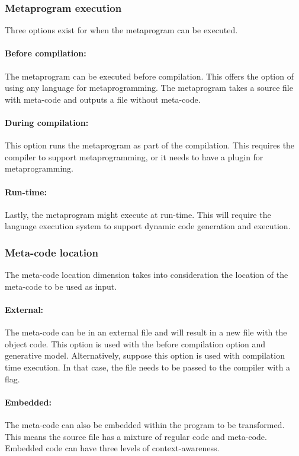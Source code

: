 \subsubsection{Metaprogram execution}
Three options exist for when the metaprogram can be executed.

\paragraph{Before compilation:}
The metaprogram can be executed before compilation.
This offers the option of using any language for metaprogramming.
The metaprogram takes a source file with meta-code and outputs a file without meta-code.

\paragraph{During compilation:}
This option runs the metaprogram as part of the compilation.
This requires the compiler to support metaprogramming, or it needs to have a plugin for metaprogramming.

\paragraph{Run-time:}
Lastly, the metaprogram might execute at run-time.
This will require the language execution system to support dynamic code generation and execution.

\subsubsection{Meta-code location}
The meta-code location dimension takes into consideration the location of the meta-code to be used as input.

\paragraph{External:}
The meta-code can be in an external file and will result in a new file with the object code.
This option is used with the before compilation option and generative model.
Alternatively, suppose this option is used with compilation time execution.
In that case, the file needs to be passed to the compiler with a flag.

\paragraph{Embedded:}
The meta-code can also be embedded within the program to be transformed.
This means the source file has a mixture of regular code and meta-code.
Embedded code can have three levels of context-awareness.

